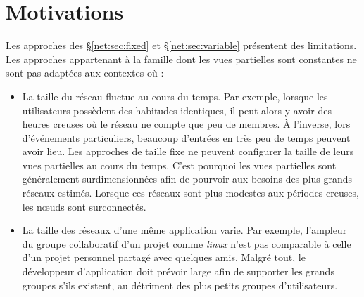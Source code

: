 
\section{Motivations}
\label{net:sec:motivations}

Les approches des §\ref{net:sec:fixed} et §\ref{net:sec:variable} présentent des
limitations. Les approches appartenant à la famille dont les vues partielles
sont constantes ne sont pas adaptées aux contextes où :
\begin{itemize}
\item La taille du réseau fluctue au cours du temps. Par exemple, lorsque les
  utilisateurs possèdent des habitudes identiques, il peut alors y avoir des
  heures creuses où le réseau ne compte que peu de membres. À l'inverse, lors
  d'événements particuliers, beaucoup d'entrées en très peu de temps peuvent
  avoir lieu.  Les approches de taille fixe ne peuvent configurer la taille de
  leurs vues partielles au cours du temps. C'est pourquoi les vues partielles
  sont généralement surdimensionnées afin de pourvoir aux besoins des plus
  grands réseaux estimés. Lorsque ces réseaux sont plus modestes aux périodes
  creuses, les nœuds sont surconnectés.
\item La taille des réseaux d'une même application varie. Par exemple, l'ampleur
  du groupe collaboratif d'un projet comme \emph{linux} n'est pas comparable à
  celle d'un projet personnel partagé avec quelques amis. Malgré tout, le
  développeur d'application doit prévoir large afin de supporter les grands
  groupes s'ils existent, au détriment des plus petits groupes d'utilisateurs.
\end{itemize}


